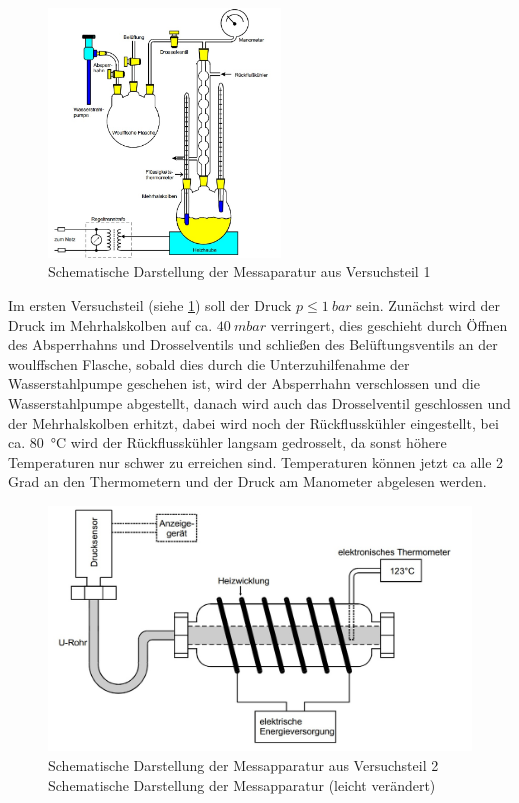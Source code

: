 
\begin{figure}
		\vspace{-1.2cm}
        \includegraphics[width=0.55\textwidth]{Grafiken/Abb3.jpg}
        \caption{Schematische Darstellung der Messaparatur aus Versuchsteil 1}
        \label{fig:Abb3}
\end{figure}

Im ersten Versuchsteil (siehe \cref{fig:Abb3}) soll der Druck $p \leq \SI{1}{bar}$ sein.
Zunächst wird der Druck im Mehrhalskolben auf ca. $\SI{40}{mbar}$ verringert, 
dies geschieht durch Öffnen des Absperrhahns und Drosselventils und schließen des Belüftungsventils 
an der woulffschen Flasche, sobald dies durch die Unterzuhilfenahme der Wasserstahlpumpe geschehen ist, 
wird der Absperrhahn verschlossen und die Wasserstahlpumpe abgestellt, danach wird auch das Drosselventil geschlossen 
und der Mehrhalskolben erhitzt, dabei wird noch der Rückflusskühler eingestellt, bei ca. \SI{80}{\celsius} wird
der Rückflusskühler langsam gedrosselt, da sonst höhere Temperaturen nur schwer zu erreichen sind.
Temperaturen können jetzt ca alle 2 Grad an den Thermometern und der Druck am Manometer abgelesen werden. \\

\begin{figure}
       \includegraphics[scale=0.3]{Grafiken/Abb4.jpg}
        \caption{Schematische Darstellung der Messapparatur aus Versuchsteil 2 Schematische Darstellung der Messapparatur (leicht verändert)}
        \label{fig:Abb4}
\end{figure}

